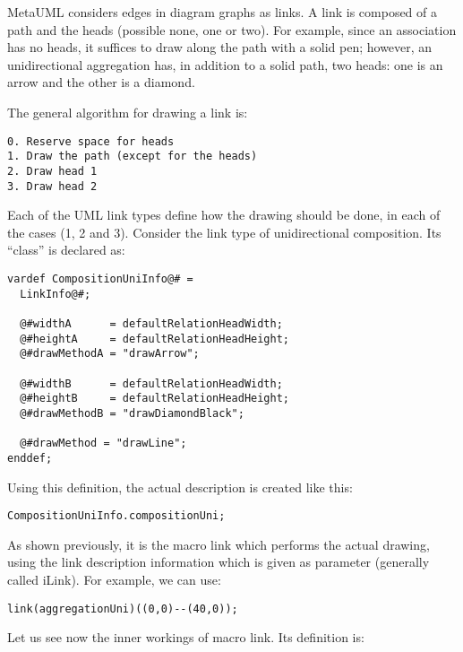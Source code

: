 \documentclass{article}
\newcommand{\code}{\ttfamily}
\begin{document}
MetaUML considers edges in diagram graphs as links. A link is composed of a path and the
heads (possible none, one or two). For example, since an association has no heads, it suffices 
to draw along the path with a solid pen; however, an unidirectional aggregation has, in addition 
to a solid path, two heads: one is an arrow and the other is a diamond.

The general algorithm for drawing a link is:

\begin{verbatim}
0. Reserve space for heads
1. Draw the path (except for the heads)
2. Draw head 1
3. Draw head 2
\end{verbatim}

Each of the UML link types define how the drawing should be done, in each of the
cases (1, 2 and 3). Consider the link type of unidirectional composition.
Its ``class'' is declared as:

\begin{verbatim}
vardef CompositionUniInfo@# =
  LinkInfo@#;

  @#widthA      = defaultRelationHeadWidth;
  @#heightA     = defaultRelationHeadHeight;
  @#drawMethodA = "drawArrow";

  @#widthB      = defaultRelationHeadWidth;
  @#heightB     = defaultRelationHeadHeight;
  @#drawMethodB = "drawDiamondBlack";

  @#drawMethod = "drawLine";
enddef;
\end{verbatim}

Using this definition, the actual description is created like this:

\begin{verbatim}
CompositionUniInfo.compositionUni;
\end{verbatim}

As shown previously, it is the macro {\code link} which
performs the actual drawing, using the link description information
which is given as parameter (generally called {\code iLink}).
For example, we can use:

\begin{verbatim}
link(aggregationUni)((0,0)--(40,0));
\end{verbatim}


Let us see now the inner workings of macro {\code link}. Its definition is:
\end{document}
